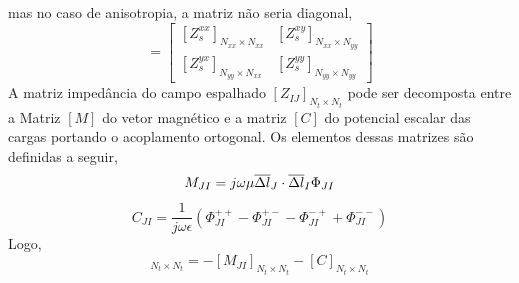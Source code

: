 \documentclass[
	12pt,				%
	openright,			%
	oneside,			%
	a4papey79r,			%
	english,			%
	brazil				%
	]{abntex2}
\begin{document}
mas no caso de anisotropia, a matriz não seria diagonal,
\begin{equation}
   [Z_s]=\begin{bmatrix}[Z_s^{xx}]_{N_{xx}\times N_{xx}}& [Z_s^{xy}]_{N_{xx}\times N_{yy}}\\
   [Z_s^{yx}]_{N_{yy}\times N_{xx}}&[Z_s^{yy}]_{N_{yy}\times N_{yy}}
   \end{bmatrix}
\end{equation}
A matriz impedância do campo espalhado  $[Z_{IJ}]_{N_t \times N_t}$ pode ser decomposta entre a Matriz $[M]$ do vetor magnético e a matriz $[C]$ do potencial escalar das cargas  portando o acoplamento ortogonal. Os elementos dessas matrizes são definidas a seguir,
\begin{equation}
   M_{JI}=   
j\omega \mu  \overline{\Delta l}_J \cdot \overline{\Delta l}_I  \Phi_{JI}\\ 
 \\
\end{equation}
\begin{equation}
   C_{JI}=   
 \frac{1}{j \omega \epsilon}  (\Phi_{JI}^{++}-\Phi_{JI}^{+-}-\Phi_{JI}^{-+}+\Phi_{JI}^{--})
\end{equation}
Logo,
\begin{equation}
    [Z_{JI}]_{N_t \times N_t}=-[M_{JI}]_{N_t \times N_t}-[C]_{N_t \times N_t}
\end{equation}
\end{document}
